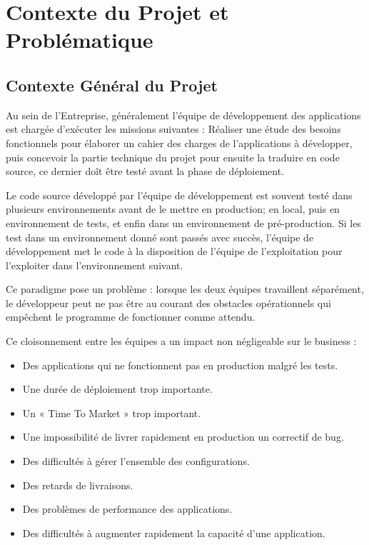 \documentclass[a4paper,11pt,oneside]{report}
\begin{document}
\newpage

\chapter{Contexte du Projet et Problématique}

\newpage

\section{Contexte Général du Projet}

Au sein de l’Entreprise, généralement l'équipe de développement des applications est chargée d’exécuter les missions suivantes : Réaliser une étude des besoins fonctionnels pour élaborer un cahier des charges de l’applications à développer, puis concevoir la partie technique du projet pour ensuite la traduire en code source, ce dernier doît être testé avant la phase de déploiement.
\newline

Le code source développé par l’équipe de développement est souvent testé dans plusieurs environnements avant de le mettre en production; en local, puis en environnement de tests, et enfin dans un environnement de pré-production. Si les test dans un environnement donné sont passés avec succès, l'équipe de développement met le code à la disposition de l’équipe de l’exploitation pour l’exploiter dans l’environnement suivant.
\newline

Ce paradigme pose un problème : lorsque les deux équipes travaillent séparément, le développeur peut ne pas être au courant des obstacles opérationnels qui empêchent le programme de fonctionner comme attendu.
\newline

Ce cloisonnement entre les équipes a un impact non négligeable sur le business :
\begin{itemize}
\item Des applications qui ne fonctionnent pas en production malgré les tests.
\item Une durée de déploiement trop importante.
\item Un « Time To Market » trop important.
\item Une impossibilité de livrer rapidement en production un correctif de bug.
\item Des difficultés à gérer l’ensemble des configurations.
\item Des retards de livraisons.
\item Des problèmes de performance des applications.
\item Des difficultés à augmenter rapidement la capacité d’une application.
\newline
\end{itemize}
\end{document}
